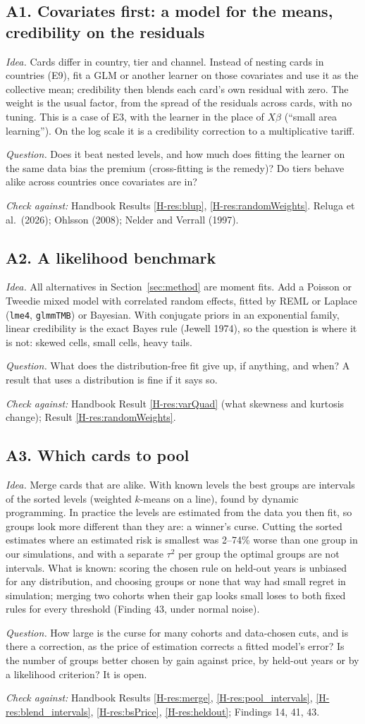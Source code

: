\documentclass[10pt]{article}
\newcommand{\hb}[1]{\ref*{H-#1}}
\newcommand{\other}[4]{%
  \subsection*{#1}
  \textit{Idea.} #2\par\smallskip
  \textit{Question.} #3\par\smallskip
  {\small\textit{Check against:} #4}\par}
\begin{document}
\other{A1. Covariates first: a model for the means, credibility on the residuals}
{Cards differ in country, tier and channel. Instead of nesting cards in countries (E9), fit a GLM
or another learner on those covariates and use it as the collective mean; credibility then blends
each card's own residual with zero. The weight is the usual factor, from the spread of the
residuals across cards, with no tuning. This is a case of E3, with the learner in the place of
$X\beta$ (``small area learning''). On the log scale it is a credibility correction to a
multiplicative tariff.}
{Does it beat nested levels, and how much does fitting the learner on the same data bias the
premium (cross-fitting is the remedy)? Do tiers behave alike across countries once covariates are
in?}
{Handbook Results \hb{res:blup}, \hb{res:randomWeights}. Reluga et al.\ (2026); Ohlsson (2008);
Nelder and Verrall (1997).}

\other{A2. A likelihood benchmark}
{All alternatives in Section~\ref{sec:method} are moment fits. Add a Poisson or Tweedie mixed
model with correlated random effects, fitted by REML or Laplace (\texttt{lme4}, \texttt{glmmTMB})
or Bayesian. With conjugate priors in an exponential family, linear credibility is the exact Bayes
rule (Jewell 1974), so the question is where it is not: skewed cells, small cells, heavy tails.}
{What does the distribution-free fit give up, if anything, and when? A result that uses a
distribution is fine if it says so.}
{Handbook Result \hb{res:varQuad} (what skewness and kurtosis change); Result \hb{res:randomWeights}.}

\other{A3. Which cards to pool}
{Merge cards that are alike. With known levels the best groups are intervals of the sorted levels
(weighted $k$-means on a line), found by dynamic programming. In practice the levels are estimated
from the data you then fit, so groups look more different than they are: a winner's curse. Cutting
the sorted estimates where an estimated risk is smallest was 2--74\% worse than one group in our
simulations, and with a separate $\tau^2$ per group the optimal groups are not intervals.
What is known: scoring the chosen rule on held-out years is unbiased for any distribution, and
choosing groups or none that way had small regret in simulation; merging two cohorts when their gap
looks small loses to both fixed rules for every threshold (Finding 43, under normal noise).}
{How large is the curse for many cohorts and data-chosen cuts, and is there a correction, as the
price of estimation corrects a fitted model's error? Is the number of groups better chosen by gain
against price, by held-out years or by a likelihood criterion? It is open.}
{Handbook Results \hb{res:merge}, \hb{res:pool_intervals}, \hb{res:blend_intervals},
\hb{res:bsPrice}, \hb{res:heldout}; Findings 14, 41, 43.}
\end{document}

